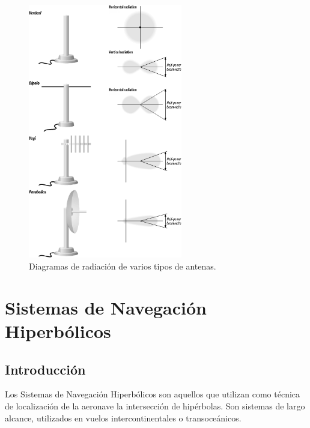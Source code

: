 \begin{figure}[!h]
  \centering
  \includegraphics[width=0.6\textwidth]{06.radionavegacion/Imagenes/06.00.ondas.electromagneticas/diagramas-radiacion-antenas.gif}
  \caption{Diagramas de radiaci\'on de varios tipos de antenas.}
  \label{fig:diagramas-radiacion-antenas}
\end{figure}





\section{Sistemas de Navegaci\'on Hiperb\'olicos}
\label{06.sistemas.navegacion.hiperbolicos}


\subsection{Introducci\'on}

Los Sistemas de Navegaci\'on Hiperb\'olicos son aquellos que utilizan como t\'ecnica de localizaci\'on de la aeronave la intersecci\'on de hip\'erbolas. Son sistemas de largo alcance, utilizados en vuelos intercontinentales o transoce\'anicos.

